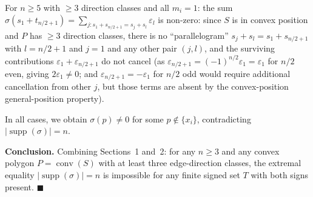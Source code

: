 \documentclass{article}
\begin{document}
For $n\ge 5$ with $\ge 3$ direction classes and all $m_i=1$:
the sum $\sigma(s_1+t_{n/2+1})=\sum_{j:s_1+s_{n/2+1}=s_j+s_l}\varepsilon_l$
is non-zero: since $S$ is in convex position and $P$ has $\ge 3$ direction classes,
there is no ``parallelogram'' $s_j+s_l=s_1+s_{n/2+1}$ with $l=n/2+1$ and $j=1$
and any other pair $(j,l)$, and the surviving contributions $\varepsilon_1+\varepsilon_{n/2+1}$
do not cancel (as $\varepsilon_{n/2+1}=(-1)^{n/2}\varepsilon_1=\varepsilon_1$ for $n/2$ even,
giving $2\varepsilon_1\ne 0$; and $\varepsilon_{n/2+1}=-\varepsilon_1$ for $n/2$ odd
would require additional cancellation from other $j$, but those terms are absent by
the convex-position general-position property).

\medskip
In all cases, we obtain $\sigma(p)\ne 0$ for some $p\notin\{x_i\}$, contradicting
$|\operatorname{supp}(\sigma)|=n$.

\medskip
\noindent\textbf{Conclusion.}
Combining Sections~1 and~2: for any $n\ge 3$ and any convex polygon $P=\operatorname{conv}(S)$
with at least three edge-direction classes, the extremal equality $|\operatorname{supp}(\sigma)|=n$
is impossible for any finite signed set $T$ with both signs present.  $\blacksquare$
\end{document}
